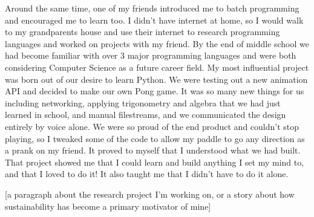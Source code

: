 Around the same time, one of my friends introduced me to batch programming and encouraged me to learn too. I didn't have internet at home, so I would walk to my grandparents house and use their internet to research programming languages and worked on projects with my friend. By the end of middle school we had become familiar with over 3 major programming languages and were both considering Computer Science as a future career field. My most influential project was born out of our desire to learn Python. We were testing out a new animation API and decided to make our own Pong game. It was so many new things for us including networking, applying trigonometry and algebra that we had just learned in school, and manual filestreams, and we communicated the design entirely by voice alone. We were so proud of the end product and couldn't stop playing, so I tweaked some of the code to allow my paddle to go any direction as a prank on my friend. It proved to myself that I understood what we had built. That project showed me that I could learn and build anything I set my mind to, and that I loved to do it! It also taught me that I didn't have to do it alone. 

[a paragraph about the research project I'm working on, or a story about how sustainability has become a primary motivator of mine]


